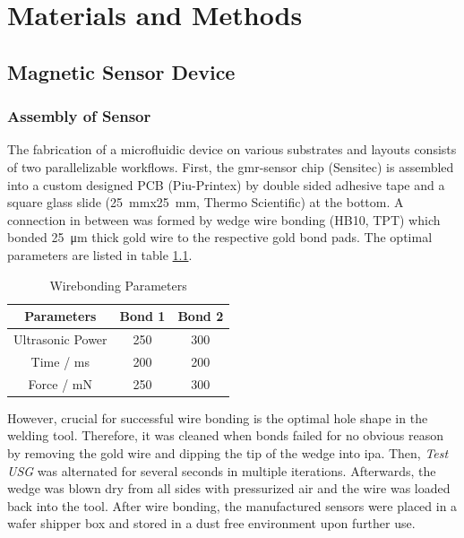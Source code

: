\chapter{Materials and Methods}

\section{Magnetic Sensor Device} 
\subsection{Assembly of Sensor}
\label{sec:meth:sensor}
The fabrication of a microfluidic device on various substrates and layouts consists of two parallelizable workflows. First, the \gls{gmr}-sensor chip (Sensitec) is assembled into a custom designed PCB (Piu-Printex) by double sided adhesive tape and a square glass slide (\SI{25}{\milli\meter}x\SI{25}{\milli\meter}, Thermo Scientific) at the bottom. A connection in between was formed by wedge wire bonding (HB10, TPT) which bonded \SI{25}{\micro\meter} thick gold wire to the respective gold bond pads. The optimal parameters are listed in table \ref{tab:params_wirebonding}. 
\begin{table}[htb]
	\centering
\begin{tabularx}{.5\linewidth}{ccc}
	\toprule[1pt]
	Parameters & Bond 1 & Bond 2 \\
	\midrule
	Ultrasonic Power & 250 & 300 \\
	Time / ms & 200 & 200 \\
	Force / mN & 250 & 300 \\
	\bottomrule[1.2pt]
\end{tabularx}
\caption{Wirebonding Parameters}
\label{tab:params_wirebonding}
\end{table}
However, crucial for successful wire bonding is the optimal hole shape in the welding tool. Therefore, it was cleaned when bonds failed for no obvious reason by removing the gold wire and dipping the tip of the wedge into \gls{ipa}. Then, \textit{Test USG} was alternated for several seconds in multiple iterations. Afterwards, the wedge was blown dry from all sides with pressurized air and the wire was loaded back into the tool.
After wire bonding, the manufactured sensors were placed in a wafer shipper box and stored in a dust free environment upon further use.

